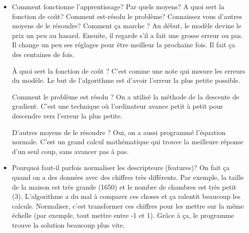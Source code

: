 \begin{itemize}
    \item Comment fonctionne l’apprentissage? Par quels moyens? A quoi sert la fonction de coût? Comment
est-résolu le problème? Connaissez vous d’autres moyens de le résoudre?
    \subitem Comment ça marche ? Au début, le modèle devine le prix un peu au hasard. Ensuite, il regarde s'il a fait une grosse erreur ou pas. Il change un peu ses réglages pour être meilleur la prochaine fois. Il fait ça des centaines de fois.

À quoi sert la fonction de coût ? C'est comme une note qui mesure les erreurs du modèle. Le but de l'algorithme est d'avoir l'erreur la plus petite possible.

Comment le problème est résolu ? On a utilisé la méthode de la descente de gradient. C'est une technique où l'ordinateur avance petit à petit pour descendre vers l'erreur la plus petite.

D'autres moyens de le résoudre ? Oui, on a aussi programmé l'équation normale. C'est un grand calcul mathématique qui trouve la meilleure réponse d'un seul coup, sans avancer pas à pas.
    \item Pourquoi faut-il parfois normaliser les descripteurs (features)?
    \subitem On fait ça quand on a des données avec des chiffres très différents. Par exemple, la taille de la maison est très grande (1650) et le nombre de chambres est très petit (3). L'algorithme a du mal à comparer ces choses et ça ralentit beaucoup les calculs.
Normaliser, c'est transformer ces chiffres pour les mettre sur la même échelle (par exemple, tout mettre entre -1 et 1). Grâce à ça, le programme trouve la solution beaucoup plus vite.
\end{itemize}